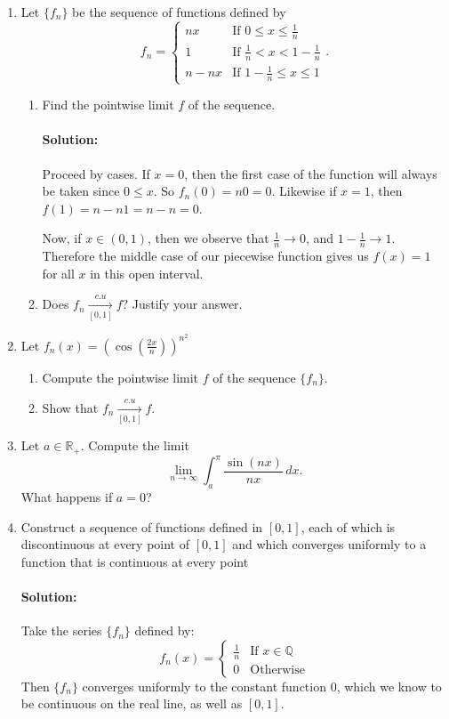 \documentclass{article}
\begin{document}
\begin{enumerate} 

\item Let $\{f_n\}$ be the sequence of functions defined by
  \[
  f_n=\begin{cases}
    nx &\text{If } 0\leq x\leq \frac{1}{n}\\
    1 &\text{If } \frac{1}{n}<x<1-\frac{1}{n}\\
    n-nx &\text{If } 1-\frac{1}{n}\leq x \leq 1
  \end{cases}
  .\] 
  \begin{enumerate}
    \item Find the pointwise limit $f$ of the sequence.
      \paragraph{Solution: }Proceed by cases. If $x=0$, then the first case of the function will always be
      taken since $0\leq x$. So $f_n(0)=n0=0$. Likewise if $x=1$, then $f(1)=n-n 1=n-n=0$.

      Now, if $x\in (0,1)$, then we observe that $\frac{1}{n}\to 0$, and $1-\frac{1}{n}\to 1$. Therefore the middle case of our piecewise function gives us $f(x)=1$ for all $x$ in this open interval. 
    \item Does $f_n\xrightarrow[{[0,1]}]{c.u}f$? Justify your answer.
  \end{enumerate}

\item Let $f_n(x)=\left( \cos\left( \frac{2x}{n}\right)  \right)^{n^2}$
  \begin{enumerate}
    \item Compute the pointwise limit $f$ of the sequence $\{f_n\} $.
    \item Show that $f_n\xrightarrow[{[0,1]}]{c.u}f$.
  \end{enumerate}
\item Let $a\in \mathbb{R}_{+}$. Compute the limit
  \[
  \lim_{n \to \infty} \int_{a}^{\pi} \frac{\sin(nx)}{nx} \, d x 
  .\] 
  What happens if $a=0$?
\item Construct a sequence of functions defined in $[0,1]$, each of which is discontinuous at every point of $[0,1]$ and which converges uniformly to a function that is continuous at every point 

  \paragraph{Solution: }Take the series $\{f_n\} $ defined by:
  \[
    f_n(x)=\begin{cases}
      \frac{1}{n}&\text{If } x\in \mathbb{Q}\\
      0&\text{Otherwise}
    \end{cases}
  \] 
  Then $\{f_n\} $ converges uniformly to the constant function $0$, which we know to be continuous on the real line, as well as $[0,1]$. 


\end{enumerate}
\end{document}

